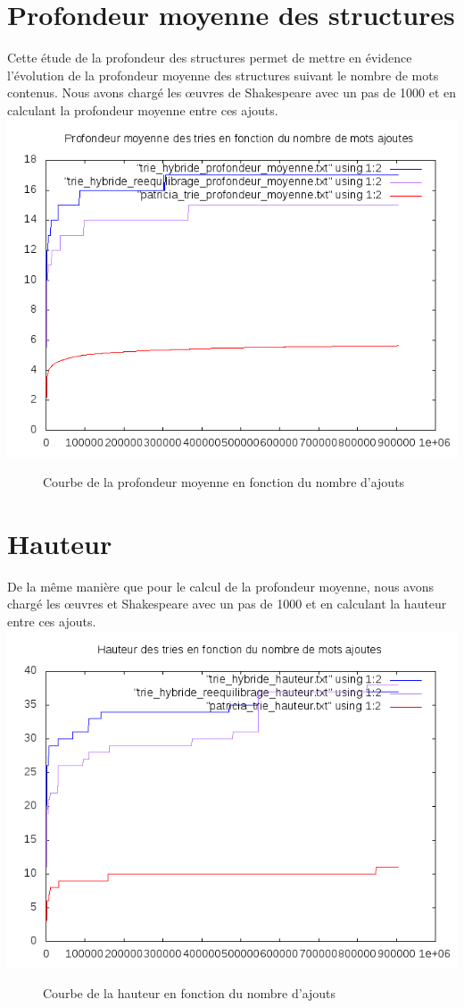 \documentclass[a4paper,12pt]{report}
\begin{document}
\section{Profondeur moyenne des structures}
Cette étude de la profondeur des structures permet de mettre en évidence l'évolution de la profondeur moyenne des structures
suivant le nombre de mots contenus. Nous avons chargé les œuvres de Shakespeare avec un pas de 1000 et en calculant la profondeur
moyenne entre ces ajouts.\\
\includegraphics{../comparaison/courbe_profondeur_moyenne.png}
\begin{figure}[!htbp]
\caption{Courbe de la profondeur moyenne en fonction du nombre d'ajouts}
\end{figure}
\section{Hauteur}
De la même manière que pour le calcul de la profondeur moyenne, nous avons chargé les œuvres et Shakespeare avec un pas de 1000
et en calculant la hauteur entre ces ajouts.\\
\includegraphics{../comparaison/courbe_hauteur.png}
\begin{figure}[!htbp]
\caption{Courbe de la hauteur en fonction du nombre d'ajouts}
\end{figure}
\end{document}
